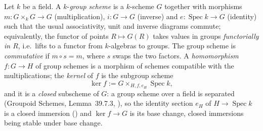 \begin{definition}
\label{def:pcb-group-scheme}
Let \(k\) be a field.  A \(k\)-\emph{group scheme} is a \(k\)-scheme
\(G\) together with morphisms \(m:G\times_kG\to G\) (multiplication),
\(i:G\to G\) (inverse) and \(e:\operatorname{Spec}k\to G\) (identity)
such that the usual associativity, unit and inverse diagrams
commute; equivalently, the functor of points
\(R\mapsto G(R)\) takes values in groups \emph{functorially in
\(R\)}, i.e.\ lifts to a functor from \(k\)-algebras to groups.  The group scheme is
\emph{commutative} if \(m\circ s=m\), where \(s\) swaps the two
factors.  A \emph{homomorphism} \(f:G\to H\) of group schemes is a
morphism of schemes compatible with the multiplications; the
\emph{kernel} of \(f\) is the subgroup scheme
\[
 \ker f:=G\times_{H,f,e_H}\operatorname{Spec}k,
\]
and it is a \emph{closed} subscheme of \(G\): a group scheme over a
field is separated (Groupoid Schemes, Lemma~39.7.3,
), so the identity section \(e_H\) of
\(H\to\operatorname{Spec}k\) is a closed immersion
() and \(\ker f\to G\) is its
base change, closed immersions being stable under base change.
\end{definition}


